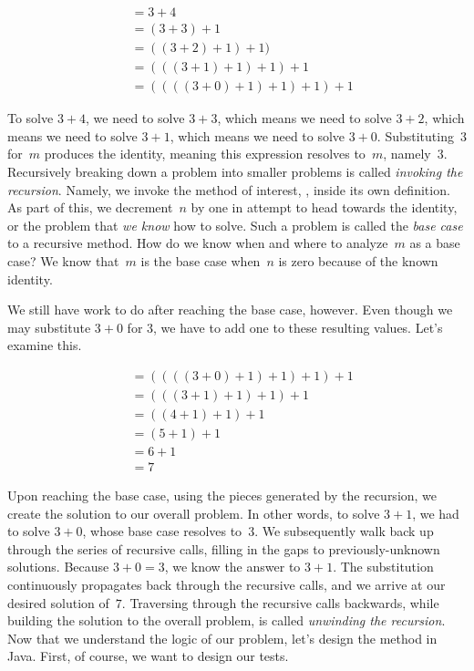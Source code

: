 \begin{align*}
    &= 3 + 4\\
    &= (3 + 3) + 1\\
    &= ((3 + 2) + 1) + 1)\\
    &= (((3 + 1) + 1) + 1) + 1\\
    &= ((((3 + 0) + 1) + 1) + 1) + 1
\end{align*}

To solve $3 + 4$, we need to solve $3 + 3$, which means we need to solve $3 + 2$, which means we need to solve $3 + 1$, which means we need to solve $3 + 0$. 
Substituting~$3$ for~$m$ produces the identity, meaning this expression resolves to~$m$, namely~$3$. 
Recursively breaking down a problem into smaller problems is called \emph{invoking the recursion}. 
Namely, we invoke the method of interest, \ttt{+}, inside its own definition. 
As part of this, we decrement~$n$ by one in attempt to head towards the identity, or the problem that \emph{we know} how to solve. 
Such a problem is called the \emph{base case} to a recursive method. 
How do we know when and where to analyze~$m$ as a base case? 
We know that~$m$ is the base case when~$n$ is zero because of the known identity.

We still have work to do after reaching the base case, however. 
Even though we may substitute $3+0$ for $3$, we have to add one to these resulting values. Let's examine this.

\begin{align*}
    &= ((((3 + 0) + 1) + 1) + 1) + 1\\
    &= (((3 + 1) + 1) + 1) + 1\\
    &= ((4 + 1) + 1) + 1\\
    &= (5 + 1) + 1\\
    &= 6 + 1\\
    &= 7
\end{align*}

Upon reaching the base case, using the pieces generated by the recursion, we create the solution to our overall problem. 
In other words, to solve $3 + 1$, we had to solve $3 + 0$, whose base case resolves to~$3$. 
We subsequently walk back up through the series of recursive calls, filling in the gaps to previously-unknown solutions. 
Because $3 + 0 = 3$, we know the answer to $3 + 1$. 
The substitution continuously propagates back through the recursive calls, and we arrive at our desired solution of~$7$. 
Traversing through the recursive calls backwards, while building the solution to the overall problem, is called \emph{unwinding the recursion}. 
Now that we understand the logic of our problem, let's design the method in Java. 
First, of course, we want to design our tests.

